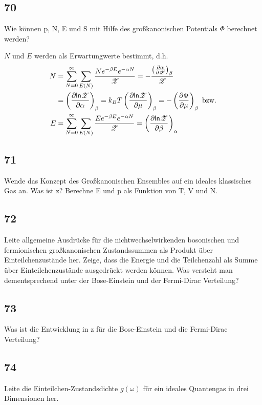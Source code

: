 \subsection{70}
\begin{myfrag}
Wie können p, N, E und S mit Hilfe des großkanonischen Potentials $\Phi$
berechnet werden?
\end{myfrag}
$N$ und $E$ werden als Erwartungwerte bestimmt, d.h.
\begin{align}
	N&=\sum\limits_{N=0}^\infty\sum\limits_{E(N)}\frac{Ne^{-\beta E}e^{-\alpha N}}{\mathscr{Z}}=-\frac{\left(\frac{\partial \alpha}{\partial \mathscr{Z}}\right)_{\beta}}{\mathscr{Z}}\nonumber\\
	&=\left(\frac{\partial \mathsf{ln} \mathscr{Z}}{\partial \alpha}\right)_{\beta}=k_BT\left(\frac{\partial \mathsf{ln} \mathscr{Z}}{\partial \mu}\right)_{\beta}=-\left(\frac{\partial \Phi}{\partial \mu}\right)_{\beta}\text{ bzw.}\\
	E&=\sum\limits_{N=0}^\infty\sum\limits_{E(N)}\frac{Ee^{-\beta E}e^{-\alpha N}}{\mathscr{Z}}=\left(\frac{\partial \mathsf{ln} \mathscr{Z}}{\partial \beta}\right)_{\alpha}
\end{align}
\subsection{71}
\begin{myfrag}
Wende das Konzept des Großkanonischen Ensembles auf ein ideales
klassisches Gas an. Was ist z? Berechne E und p als Funktion von T, V und
N.
\end{myfrag}
\subsection{72}
\begin{myfrag}
Leite allgemeine Ausdrücke für die nichtwechselwirkenden bosonischen und
fermionischen großkanonischen Zustandssummen als Produkt über Einteilchenzustände
her. Zeige, dass die Energie und die Teilchenzahl als
Summe über Einteilchenzustände ausgedrückt werden können. Was versteht
man dementsprechend unter der Bose-Einstein und der Fermi-Dirac
Verteilung?
\end{myfrag}
\subsection{73}
\begin{myfrag}
Was ist die Entwicklung in z für die Bose-Einstein und die Fermi-Dirac
Verteilung?
\end{myfrag}
\subsection{74}
\begin{myfrag}
Leite die Einteilchen-Zustandsdichte $g(\omega )$ für ein ideales Quantengas in drei
Dimensionen her.
\end{myfrag}
